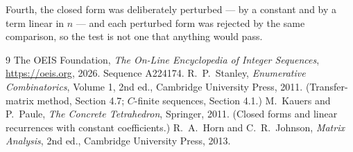 \documentclass[11pt,a4paper]{article}
\theoremstyle{plain}
\theoremstyle{definition}
\begin{document}
Fourth, the closed form was deliberately perturbed --- by a constant and by a term linear in
$n$ --- and each perturbed form was rejected by the same comparison, so the test is not one
that anything would pass.

\begin{thebibliography}{9}
 The OEIS Foundation, \emph{The On-Line Encyclopedia of Integer
Sequences}, \url{https://oeis.org}, 2026. Sequence A224174.
 R.~P.~Stanley, \emph{Enumerative Combinatorics}, Volume 1, 2nd ed.,
Cambridge University Press, 2011. (Transfer-matrix method, Section 4.7; $C$-finite sequences,
Section 4.1.)
 M.~Kauers and P.~Paule, \emph{The Concrete Tetrahedron}, Springer, 2011.
(Closed forms and linear recurrences with constant coefficients.)
 R.~A.~Horn and C.~R.~Johnson, \emph{Matrix Analysis}, 2nd ed., Cambridge
University Press, 2013.
\end{thebibliography}
\end{document}
